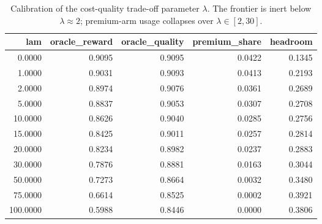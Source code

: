 \begin{table}
\caption{Calibration of the cost-quality trade-off parameter $\lambda$. The frontier is inert below $\lambda \approx 2$; premium-arm usage collapses over $\lambda \in [2, 30]$.}
\label{tab:lambda}
\begin{tabular}{rrrrr}
\toprule
lam & oracle_reward & oracle_quality & premium_share & headroom \\
\midrule
0.0000 & 0.9095 & 0.9095 & 0.0422 & 0.1345 \\
1.0000 & 0.9031 & 0.9093 & 0.0413 & 0.2193 \\
2.0000 & 0.8974 & 0.9076 & 0.0361 & 0.2689 \\
5.0000 & 0.8837 & 0.9053 & 0.0307 & 0.2708 \\
10.0000 & 0.8626 & 0.9040 & 0.0285 & 0.2756 \\
15.0000 & 0.8425 & 0.9011 & 0.0257 & 0.2814 \\
20.0000 & 0.8234 & 0.8982 & 0.0237 & 0.2883 \\
30.0000 & 0.7876 & 0.8881 & 0.0163 & 0.3044 \\
50.0000 & 0.7273 & 0.8664 & 0.0032 & 0.3480 \\
75.0000 & 0.6614 & 0.8525 & 0.0002 & 0.3921 \\
100.0000 & 0.5988 & 0.8446 & 0.0000 & 0.3806 \\
\bottomrule
\end{tabular}
\end{table}
